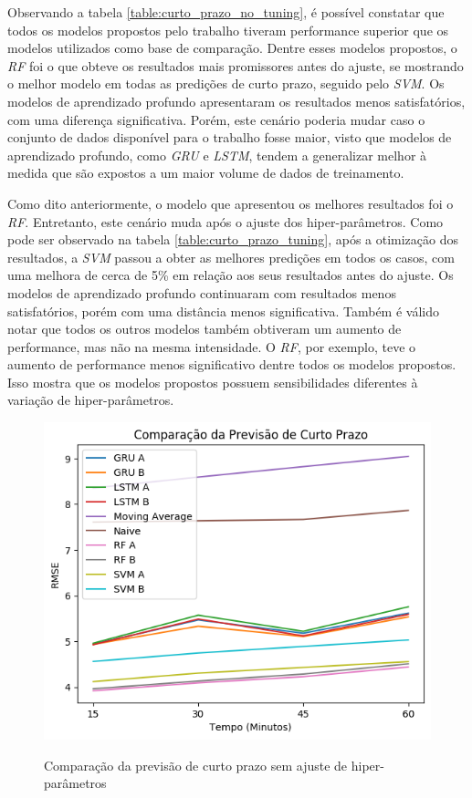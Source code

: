  Observando a tabela \ref{table:curto_prazo_no_tuning}, é possível constatar que todos os modelos propostos pelo trabalho tiveram performance superior que os modelos utilizados como base de comparação. Dentre esses modelos propostos, o \textit{\acrshort{RF}} foi o que obteve os resultados mais promissores antes do ajuste, se mostrando o melhor modelo em todas as predições de curto prazo, seguido pelo \textit{\acrshort{SVM}}. Os modelos de aprendizado profundo apresentaram os resultados menos satisfatórios, com uma diferença significativa. Porém, este cenário poderia mudar caso o conjunto de dados disponível para o trabalho fosse maior, visto que modelos de aprendizado profundo, como \textit{\acrshort{GRU}} e \textit{\acrshort{LSTM}}, tendem a generalizar melhor à medida que são expostos a um maior volume de dados de treinamento. 

Como dito anteriormente, o modelo que apresentou os melhores resultados foi o \textit{\acrshort{RF}}. Entretanto, este cenário muda após o ajuste dos hiper-parâmetros. Como pode ser observado na tabela \ref{table:curto_prazo_tuning}, após a otimização dos resultados, a \textit{\acrshort{SVM}} passou a obter as melhores predições em todos os casos, com uma melhora de cerca de 5\% em relação aos seus resultados antes do ajuste. Os modelos de aprendizado profundo continuaram com resultados menos satisfatórios, porém com uma distância menos significativa. Também é válido notar que todos os outros modelos também obtiveram um aumento de performance, mas não na mesma intensidade. O \textit{\acrshort{RF}}, por exemplo, teve o aumento de performance menos significativo dentre todos os modelos propostos. Isso mostra que os modelos propostos possuem sensibilidades diferentes à variação de hiper-parâmetros.
 
 \begin{figure}[H]
    \centering
    \includegraphics[scale=0.9]{monography/img/comparisons/comparacao_da_previsao_de_curto_prazo_rmse.png}
    \label{figure:pred_no_tuning}
    \caption{Comparação da previsão de curto prazo sem ajuste de hiper-parâmetros}
\end{figure}


